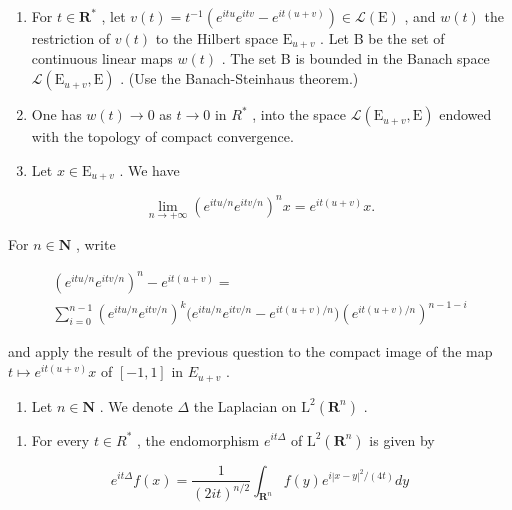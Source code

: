 \begin{enumerate}
\def\labelenumi{\alph{enumi})}
\item
  For \(t \in \mathbf{R}^*\) , let \(v(t) = t^{-1}(e^{itu}e^{itv} - e^{it(u + v)}) \in \mathcal{L}(\mathrm{E})\) , and \(w(t)\) the restriction of \(v(t)\) to the Hilbert space \(\mathrm{E}_{u + v}\) . Let B be the set of continuous linear maps \(w(t)\) . The set B is bounded in the Banach space \(\mathcal{L}(\mathrm{E}_{u + v},\mathrm{E})\) . (Use the Banach-Steinhaus theorem.)
\item
  One has \(w(t) \to 0\) as \(t \to 0\) in \(R^{*}\) , into the space \(\mathcal{L}(\mathrm{E}_{u+v},\mathrm{E})\) endowed with the topology of compact convergence.
\item
  Let \(x\in \mathrm{E}_{u + v}\) . We have
\end{enumerate}

\[
\lim _ {n \to + \infty} (e ^ {i t u / n} e ^ {i t v / n}) ^ {n} x = e ^ {i t (u + v)} x.
\]

For \(n\in \mathbf{N}\) , write

\[
\begin{array}{l} (e ^ {i t u / n} e ^ {i t v / n}) ^ {n} - e ^ {i t (u + v)} = \\ \sum_ {i = 0} ^ {n - 1} (e ^ {i t u / n} e ^ {i t v / n}) ^ {k} \Big (e ^ {i t u / n} e ^ {i t v / n} - e ^ {i t (u + v) / n} \Big) (e ^ {i t (u + v) / n}) ^ {n - 1 - i} \end{array}
\]

and apply the result of the previous question to the compact image of the map \(t \mapsto e^{it(u+v)}x\) of \([-1,1]\) in \(E_{u+v}\) .

\begin{enumerate}
\def\labelenumi{\arabic{enumi})}
\setcounter{enumi}{32}
\tightlist
\item
  Let \(n \in \mathbf{N}\) . We denote \(\Delta\) the Laplacian on \(\mathrm{L}^2(\mathbf{R}^n)\) .
\end{enumerate}

\begin{enumerate}
\def\labelenumi{\alph{enumi})}
\tightlist
\item
  For every \(t \in R^{*}\) , the endomorphism \(e^{it\Delta}\) of \(\mathrm{L}^{2}(\mathbf{R}^{n})\) is given by
\end{enumerate}

\[
e ^ {i t \Delta} f (x) = \frac {1}{(2 i t) ^ {n / 2}} \int_ {\mathbf {R} ^ {n}} f (y) e ^ {i | x - y | ^ {2} / (4 t)} d y
\]

